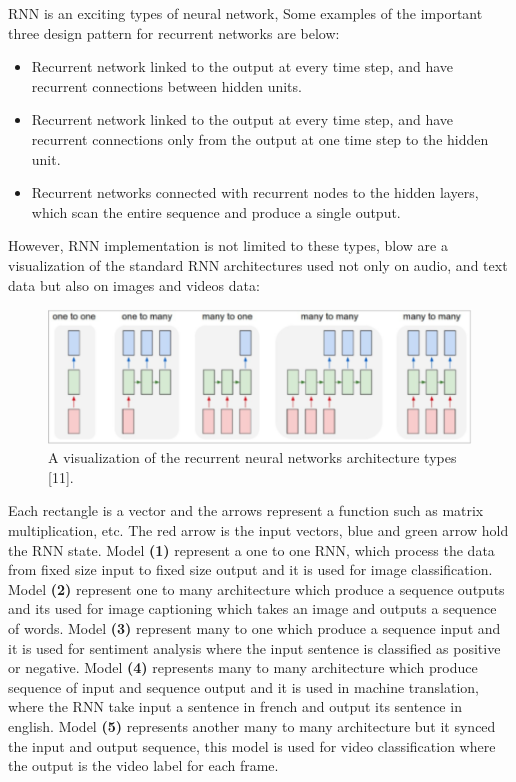 RNN is an exciting types of neural network, 
Some examples of the important three design pattern for recurrent networks are below:
\begin{itemize}
    \item Recurrent network linked to the output at every time step, and have recurrent connections between hidden units.
    \item Recurrent network linked to the output at every time step, and have recurrent connections only from the output at one time step to the hidden unit.
    \item Recurrent networks connected with recurrent nodes to the hidden layers, which scan the entire sequence and produce a single output.
\end{itemize} 
However, RNN implementation is not limited to these types, blow are a visualization of the standard RNN architectures used not only on audio, and text data but also on images and videos data:
\begin{figure}[ht]
\centering
\includegraphics{Figures/rnn}
\decoRule
\caption[A visualization of the recurrent neural networks architectures types"11".]{A visualization of the recurrent neural networks architecture types [11].}
\label{fig:la}
\end{figure}
Each rectangle is a vector and the arrows represent a function such as matrix multiplication, etc. The red arrow is the input  vectors, blue and green arrow hold the RNN state. Model \textbf{(1)} represent a one to one RNN, which process the data from fixed size input to fixed size output and it is used for image classification. Model \textbf{(2)} represent one to many architecture which produce a sequence outputs and its used for image captioning which takes an image and outputs a sequence of words. Model \textbf{(3)} represent many to one which produce a sequence input and it is used for sentiment analysis where the input sentence is classified as positive or negative. Model \textbf{(4)} represents many to many architecture which produce sequence of input and sequence output  and it is used in machine translation, where the RNN take input a sentence in french and output its sentence in english. Model \textbf{(5)} represents another many to many architecture but it synced the input and output sequence, this model is used for video classification where the output is the video label for each frame.\\

